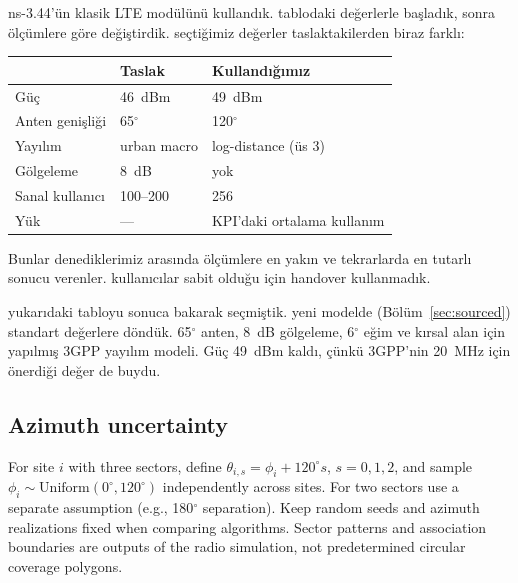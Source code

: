 \documentclass[11pt,a4paper]{article}
\newenvironment{progress}{\par\smallskip\color{blue}}{\par\smallskip}
\newenvironment{yeni}{\par\smallskip\color{teal}}{\par\smallskip}
\begin{document}
\begin{progress}
ns-3.44'ün klasik LTE modülünü kullandık. tablodaki değerlerle başladık, sonra ölçümlere göre değiştirdik. seçtiğimiz değerler taslaktakilerden biraz farklı:
\begin{center}\small
\begin{tabular}{@{}lll@{}}\toprule
 & Taslak & Kullandığımız \\\midrule
Güç & 46~dBm & 49~dBm \\
Anten genişliği & 65$^\circ$ & 120$^\circ$ \\
Yayılım & urban macro & log-distance (üs 3) \\
Gölgeleme & 8~dB & yok \\
Sanal kullanıcı & 100--200 & 256 \\
Yük & --- & KPI'daki ortalama kullanım \\\bottomrule
\end{tabular}
\end{center}
Bunlar denediklerimiz arasında ölçümlere en yakın ve tekrarlarda en tutarlı sonucu verenler. kullanıcılar sabit olduğu için handover kullanmadık.
\end{progress}

\begin{yeni}
yukarıdaki tabloyu sonuca bakarak seçmiştik. yeni modelde (Bölüm~\ref{sec:sourced}) standart değerlere döndük. 65$^\circ$ anten, 8~dB gölgeleme, 6$^\circ$ eğim ve kırsal alan için yapılmış 3GPP yayılım modeli. Güç 49~dBm kaldı, çünkü 3GPP'nin 20~MHz için önerdiği değer de buydu.
\end{yeni}

\subsection{Azimuth uncertainty}
For site $i$ with three sectors, define $\theta_{i,s}=\phi_i+120^\circ s$, $s=0,1,2$, and sample $\phi_i\sim\mathrm{Uniform}(0^\circ,120^\circ)$ independently across sites. For two sectors use a separate assumption (e.g., 180$^\circ$ separation). Keep random seeds and azimuth realizations fixed when comparing algorithms. Sector patterns and association boundaries are outputs of the radio simulation, not predetermined circular coverage polygons.
\end{document}
